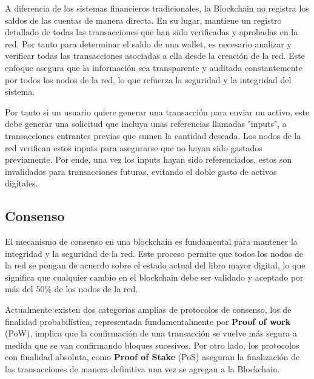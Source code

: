 
A diferencia de los sistemas financieros tradicionales, la Blockchain no registra los saldos de las cuentas de manera directa. En su lugar, mantiene un registro detallado de todas las transacciones que han sido verificadas y aprobadas en la red.
Por tanto para determinar el saldo de una wallet, es necesario analizar y verificar todas las transacciones asociadas a ella desde la creación de la red. Este enfoque asegura que la información sea transparente y auditada constantemente por todos los nodos de la red, lo que refuerza la seguridad y la integridad del sistema.

Por tanto si un usuario quiere generar una transacción para enviar un activo, este debe generar una solicitud que incluya unas referencias llamadas "inputs", a transacciones entrantes previas que sumen la cantidad deseada. Los nodos de la red verifican estos inputs para asegurarse que no hayan sido gastados previamente.
Por ende, una vez los inputs hayan sido referenciados, estos son invalidados para transacciones futuras, evitando el doble gasto de activos digitales.


\subsection{Consenso}

El mecanismo de consenso en una blockchain es fundamental para mantener la integridad y la seguridad de la red. Este proceso permite que todos los nodos de la red se pongan de acuerdo sobre el estado actual del libro mayor digital, lo que significa que cualquier cambio en el blockchain debe ser validado y aceptado por más del 50\% de los nodos de la red.

Actualmente existen dos categorías amplias de protocolos de consenso, los de finalidad probabilística, representada fundamentalmente por \textbf{Proof of work} (PoW), implica que la confirmación de una transacción se vuelve más segura a medida que se van confirmando bloques sucesivos.
Por otro lado, los protocolos con finalidad absoluta, como \textbf{Proof of Stake} (PoS) aseguran la finalización de las transacciones de manera definitiva una vez se agregan a la Blockchain.

